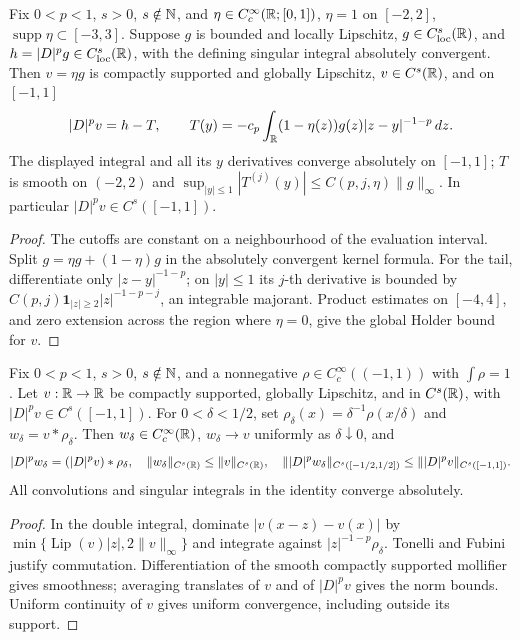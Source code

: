 \begin{lemma}
  \label{lem:c03_gain_localization}
  Fix $0<p<1$, $s>0$, $s\notin\mathbb{N}$, and $\eta\in C_c^\infty(\mathbb{R};[0,1])$,
  $\eta=1$ on $[-2,2]$, $\operatorname{supp}\eta\subset[-3,3]$.
  Suppose $g$ is bounded and locally Lipschitz, $g\in C^s_{\rm loc}(\mathbb{R})$, and
  $h=|D|^pg\in C^s_{\rm loc}(\mathbb{R})$, with the defining singular integral absolutely convergent.
  Then $v=\eta g$ is compactly supported and globally Lipschitz, $v\in C^s(\mathbb{R})$, and on $[-1,1]$
  \[
    |D|^pv=h-T,\qquad
    T(y)=-c_p\int_{\mathbb{R}}(1-\eta(z))g(z)|z-y|^{-1-p}\,dz.
  \]
  The displayed integral and all its $y$ derivatives converge absolutely on $[-1,1]$;
  $T$ is smooth on $(-2,2)$ and $\sup_{|y|\le1}|T^{(j)}(y)|\le C(p,j,\eta)\|g\|_\infty$.
  In particular $|D|^pv\in C^s([-1,1])$.
\end{lemma}
\begin{proof}
  The cutoffs are constant on a neighbourhood of the evaluation interval. Split
  $g=\eta g+(1-\eta)g$ in the absolutely convergent kernel formula. For the tail, differentiate
  only $|z-y|^{-1-p}$; on $|y|\le1$ its $j$-th derivative is bounded by
  $C(p,j)\mathbf1_{|z|\ge2}|z|^{-1-p-j}$, an integrable majorant.
  Product estimates on $[-4,4]$, and zero extension across the region where $\eta=0$,
  give the global Holder bound for $v$.
\end{proof}

\begin{lemma}
  \label{lem:c03_gain_mollification}
  Fix $0<p<1$, $s>0$, $s\notin\mathbb{N}$, and a nonnegative $\rho\in C_c^\infty((-1,1))$
  with $\int\rho=1$. Let $v:\mathbb{R}\to\mathbb{R}$ be compactly supported, globally Lipschitz,
  and in $C^s(\mathbb{R})$, with $|D|^pv\in C^s([-1,1])$.
  For $0<\delta<1/2$, set $\rho_\delta(x)=\delta^{-1}\rho(x/\delta)$ and
  $w_\delta=v*\rho_\delta$. Then $w_\delta\in C_c^\infty(\mathbb{R})$,
  $w_\delta\to v$ uniformly as $\delta\downarrow0$, and
  \[
    |D|^pw_\delta=(|D|^pv)*\rho_\delta,\quad
    \|w_\delta\|_{C^s(\mathbb{R})}\le\|v\|_{C^s(\mathbb{R})},\quad
    \||D|^pw_\delta\|_{C^s([-1/2,1/2])}\le\||D|^pv\|_{C^s([-1,1])}.
  \]
  All convolutions and singular integrals in the identity converge absolutely.
\end{lemma}
\begin{proof}
  In the double integral, dominate $|v(x-z)-v(x)|$ by
  $\min\{\operatorname{Lip}(v)|z|,2\|v\|_\infty\}$ and integrate against
  $|z|^{-1-p}\rho_\delta$. Tonelli and Fubini justify commutation.
  Differentiation of the smooth compactly supported mollifier gives smoothness;
  averaging translates of $v$ and of $|D|^pv$ gives the norm bounds. Uniform continuity of $v$
  gives uniform convergence, including outside its support.
\end{proof}


